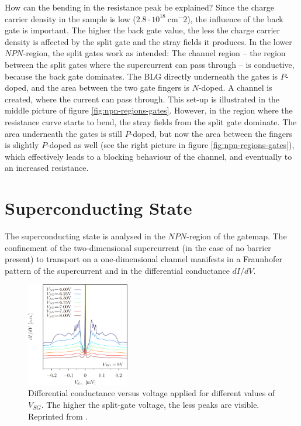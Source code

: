 How can the bending in the resistance peak be explained?  Since the charge carrier density in the sample is low ($2.8\cdot 10^{18}\ \text{cm}^-2$), the influence of the back gate is important. The higher the back gate value, the less the charge carrier density is affected by the split gate and the stray fields it produces. In the lower $NPN$-region, the split gates work as intended: The channel region -- the region between the split gates where the supercurrent can pass through -- is conductive, because the back gate dominates. The BLG directly underneath the gates is $P$-doped, and the area between the two gate fingers is $N$-doped. A channel is created, where the current can pass through. This set-up is illustrated in the middle picture of figure \ref{fig:npn-regions-gates}. However, in the region where the resistance curve starts to bend, the stray fields from the split gate dominate. The area underneath the gates is still $P$-doped, but now the area between the fingers is slightly $P$-doped as well (see the right picture in figure \ref{fig:npn-regions-gates}), which effectively leads to a blocking behaviour of the channel, and eventually to an increased resistance.

\section{Superconducting State}\label{sec:experiment-superconducting}

The superconducting state is analysed in the $NPN$-region of the gatemap. The confinement of the two-dimensional supercurrent (in the case of no barrier present) to transport on a one-dimensional channel manifests in a Fraunhofer pattern of the supercurrent and in the differential conductance $dI/dV$. 

\begin{figure}
\centering
\includegraphics[width=0.4\textwidth]{figure/experiment/mar}
\caption{Differential conductance versus voltage applied for different values of $V_{SG}$. The higher the split-gate voltage, the less peaks are visible. Reprinted from \cite{Kraft2017}.}\label{fig:mar}
\end{figure}

